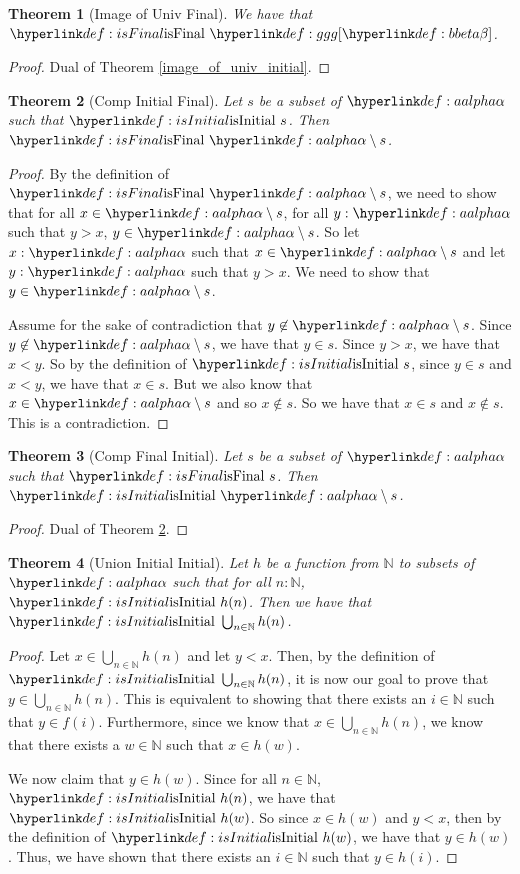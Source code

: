 \documentclass{article}
\newtheorem{theorem}{Theorem}
\theoremstyle{definition}
\newcommand{\N}{\mathbb{N}}
\begin{document}
\begin{theorem}[Image of Univ Final]
\label{image_of_univ_final}
We have that $\isFinal{\tg[\bbeta]}$.
\end{theorem}
\begin{proof}
Dual of Theorem \ref{image_of_univ_initial}.
\end{proof}

\begin{theorem}[Comp Initial Final]
\label{comp_initial_final}
Let $s$ be a subset of $\aalpha$ such that $\isInitial{s}$. Then $\isFinal{\aalpha\setminus s}$.
\end{theorem}
\begin{proof}
By the definition of $\isFinal{\aalpha\setminus s}$, we need to show that for all $x \in \aalpha \setminus s$, for all $y : \aalpha$ such that $y > x$, $y\in \aalpha \setminus s$. So let $x : \aalpha$ such that $x \in \aalpha\setminus s$ and let $y : \aalpha$ such that $y > x$. We need to show that $y\in \aalpha \setminus s$.

Assume for the sake of contradiction that $y\not\in \aalpha\setminus s$. Since $y\not\in \aalpha\setminus s$, we have that $y\in s$. Since $y > x$, we have that $x < y$. So by the definition of $\isInitial{s}$, since $y\in s$ and $x < y$, we have that $x\in s$. But we also know that $x\in \aalpha\setminus s$ and so $x\not\in s$. So we have that $x\in s$ and $x\not\in s$. This is a contradiction.
\end{proof}

\begin{theorem}[Comp Final Initial]
\label{comp_final_initial}
Let $s$ be a subset of $\aalpha$ such that $\isFinal{s}$. Then $\isInitial{\aalpha\setminus s}$.
\end{theorem}
\begin{proof}
Dual of Theorem \ref{comp_initial_final}.
\end{proof}

\begin{theorem}[Union Initial Initial]
\label{union_initial_initial}
Let $h$ be a function from $\N$ to subsets of $\aalpha$ such that for all $n : \N$, $\isInitial{h(n)}$. Then we have that $\isInitial{\bigcup_{n\in \N} h(n)}$.
\end{theorem}
\begin{proof}
Let $x\in \bigcup_{n\in \N} h(n)$ and let $y < x$. Then, by the definition of $\isInitial{\bigcup_{n\in \N} h(n)}$, it is now our goal to prove that $y\in \bigcup_{n\in \N} h(n)$. This is equivalent to showing that there exists an $i\in \N$ such that $y \in f(i)$. Furthermore, since we know that $x\in \bigcup_{n\in \N} h(n)$, we know that there exists a $w\in \N$ such that $x\in h(w)$.

We now claim that $y \in h(w)$. Since for all $n\in \N$, $\isInitial{h(n)}$, we have that $\isInitial{h(w)}$. So since $x\in h(w)$ and $y < x$, then by the definition of $\isInitial{h(w)}$, we have that $y\in h(w)$. Thus, we have shown that there exists an $i\in \N$ such that $y\in h(i)$.
\end{proof}
\end{document}
